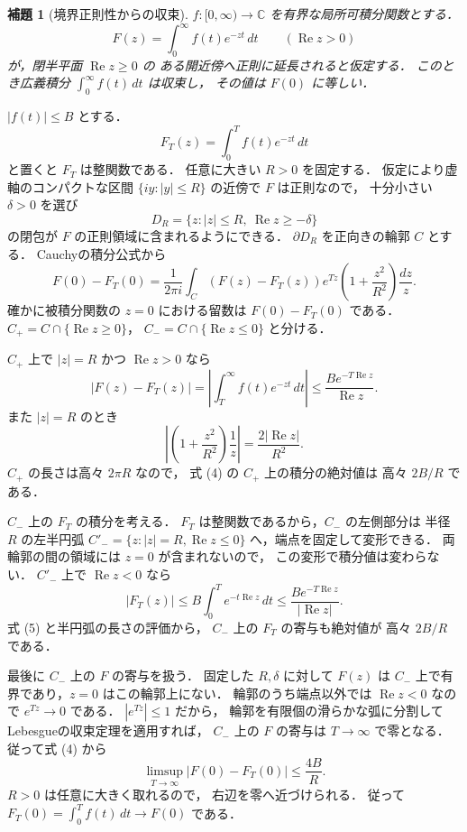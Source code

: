 \documentclass[a5paper,10pt,onecolumn]{jsarticle}
\makeatletter
\theoremstyle{mathnotetheorem}
\newtheorem{lemma}[theorem]{補題}
\renewcommand{\proofname}{証明}
\renewenvironment{proof}[1][\proofname]{%
  \par\pushQED{\qed}\normalfont\topsep4\p@\@plus2\p@\relax
  \trivlist\item[\hskip\labelsep\bfseries #1]\ignorespaces
}{\popQED\endtrivlist\@endpefalse}
\makeatother
\begin{document}
\begin{lemma}[境界正則性からの収束]\label{lem:newman}
$f:[0,\infty)\to\mathbb C$ を有界な局所可積分関数とする．
\[
 F(z)=\int_0^\infty f(t)e^{-zt}\,dt
 \qquad(\operatorname{Re}z>0)
\]
が，閉半平面 $\operatorname{Re}z\ge0$ の
ある開近傍へ正則に延長されると仮定する．
このとき広義積分 $\int_0^\infty f(t)\,dt$ は収束し，
その値は $F(0)$ に等しい．
\end{lemma}
\begin{proof}
$|f(t)|\le B$ とする．
\[
 F_T(z)=\int_0^Tf(t)e^{-zt}\,dt
\]
と置くと $F_T$ は整関数である．
任意に大きい $R>0$ を固定する．
仮定により虚軸のコンパクトな区間
$\{iy:|y|\le R\}$ の近傍で $F$ は正則なので，
十分小さい $\delta>0$ を選び
\[
 D_R=\{z:|z|\le R,\ \operatorname{Re}z\ge-\delta\}
\]
の閉包が $F$ の正則領域に含まれるようにできる．
$\partial D_R$ を正向きの輪郭 $C$ とする．
Cauchyの積分公式から
\[
 F(0)-F_T(0)=\frac1{2\pi i}
 \int_C(F(z)-F_T(z))e^{Tz}
 \left(1+\frac{z^2}{R^2}\right)\frac{dz}{z}.
 \tag{4}
\]
確かに被積分関数の $z=0$ における留数は
$F(0)-F_T(0)$ である．
$C_+=C\cap\{\operatorname{Re}z\ge0\}$，
$C_-=C\cap\{\operatorname{Re}z\le0\}$ と分ける．

$C_+$ 上で $|z|=R$ かつ $\operatorname{Re}z>0$ なら
\[
 |F(z)-F_T(z)|
 =\left|\int_T^\infty f(t)e^{-zt}\,dt\right|
 \le \frac{B e^{-T\operatorname{Re}z}}{\operatorname{Re}z}.
\]
また $|z|=R$ のとき
\[
 \left|\left(1+\frac{z^2}{R^2}\right)\frac1z\right|
 =\frac{2|\operatorname{Re}z|}{R^2}.
 \tag{5}
\]
$C_+$ の長さは高々 $2\pi R$ なので，
式 (4) の $C_+$ 上の積分の絶対値は
高々 $2B/R$ である．

$C_-$ 上の $F_T$ の積分を考える．
$F_T$ は整関数であるから，$C_-$ の左側部分は
半径 $R$ の左半円弧
$C'_-=\{z:|z|=R,\operatorname{Re}z\le0\}$
へ，端点を固定して変形できる．
両輪郭の間の領域には $z=0$ が含まれないので，
この変形で積分値は変わらない．
$C'_-$ 上で $\operatorname{Re}z<0$ なら
\[
 |F_T(z)|
 \le B\int_0^Te^{-t\operatorname{Re}z}\,dt
 \le \frac{B e^{-T\operatorname{Re}z}}{|\operatorname{Re}z|}.
\]
式 (5) と半円弧の長さの評価から，
$C_-$ 上の $F_T$ の寄与も絶対値が
高々 $2B/R$ である．

最後に $C_-$ 上の $F$ の寄与を扱う．
固定した $R,\delta$ に対して $F(z)$ は
$C_-$ 上で有界であり，$z=0$ はこの輪郭上にない．
輪郭のうち端点以外では
$\operatorname{Re}z<0$ なので
$e^{Tz}\to0$ である．
$|e^{Tz}|\le1$ だから，
輪郭を有限個の滑らかな弧に分割して
Lebesgueの収束定理を適用すれば，
$C_-$ 上の $F$ の寄与は $T\to\infty$ で零となる．
従って式 (4) から
\[
 \limsup_{T\to\infty}|F(0)-F_T(0)|
 \le\frac{4B}{R}.
\]
$R>0$ は任意に大きく取れるので，
右辺を零へ近づけられる．
従って $F_T(0)=\int_0^Tf(t)\,dt\to F(0)$ である．
\end{proof}
\end{document}
